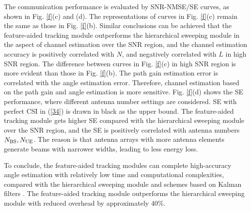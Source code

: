 \documentclass[journal,12pt,onecolumn,draftclsnofoot,]{IEEEtran}
\begin{document}
The communication performance is evaluated by SNR-NMSE/SE curves, as shown in Fig. \ref{f}(c) and (d). The representations of curves in Fig. \ref{f}(c) remain the same as those in Fig. \ref{f}(b). 
Similar conclusions can be achieved that the feature-aided tracking module outperforms the hierarchical sweeping module in the aspect of channel estimation over the SNR region, and the channel estimation accuracy is positively correlated with $N$, and negatively correlated with $L$ in high SNR region. 
The difference between curves in Fig. \ref{f}(c) in high SNR region is more evident than those in Fig. \ref{f}(b). The path gain estimation error is correlated with the angle estimation error. 
Therefore, channel estimation based on the path gain and angle estimation is more sensitive. 
Fig. \ref{f}(d) shows the SE performance, where different antenna number settings are considered. SE with perfect CSI in (\ref{34}) is drawn in black as the upper bound.
The feature-aided tracking module gets higher SE compared with the hierarchical sweeping module over the SNR region, and the SE is positively correlated with antenna numbers $N_{\rm BS},N_{\rm UE}$. 
The reason is that antenna arrays with more antenna elements generate beams with narrower widths, leading to less energy loss.

To conclude, the feature-aided tracking modules can complete high-accuracy angle estimation with relatively low time and computational complexities, compared with the hierarchical sweeping module and schemes based on Kalman filters \cite{a1001,a100101}. 
The feature-aided tracking module outperforms the hierarchical sweeping module with reduced overhead by approximately $40\%$.
\end{document}

